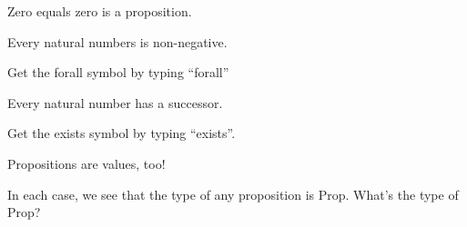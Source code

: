 \documentclass[letterpaper,10pt,english]{sphinxmanual}
\begin{document}
Zero equals zero is a proposition.

\begin{sphinxVerbatim}[commandchars=\\\{\}]
 

 
\end{sphinxVerbatim}

Every natural numbers is non-negative.

\begin{sphinxVerbatim}[commandchars=\\\{\}]
      
\end{sphinxVerbatim}

Get the forall symbol by typing “forall”

Every natural number has a successor.

\begin{sphinxVerbatim}[commandchars=\\\{\}]
           

      
\end{sphinxVerbatim}

Get the exists symbol by typing “exists”.

Propositions are values, too!

\begin{sphinxVerbatim}[commandchars=\\\{\}]
             

 
\end{sphinxVerbatim}

In each case, we see that the type of any proposition is Prop. What’s
the type of Prop?
\end{document}
